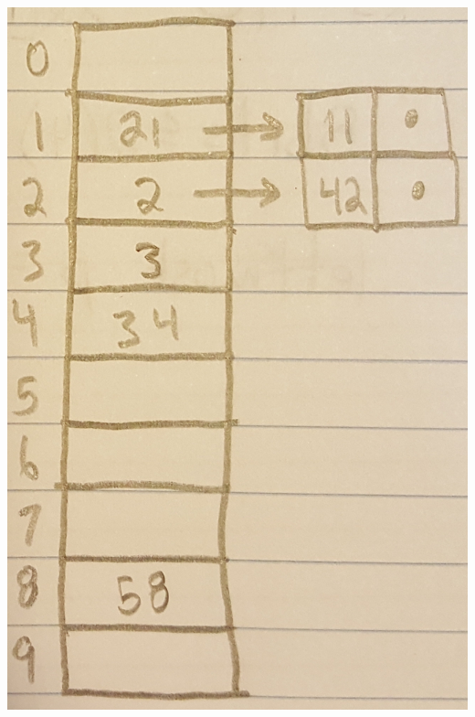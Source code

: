 \documentclass[12pt]{elsart}
\begin{document}
\begin{enumerate}
\begin{enumerate}
	\includegraphics[scale=0.12]{3-1-b.jpg}
\end{enumerate}


\end{enumerate}
\end{document}

